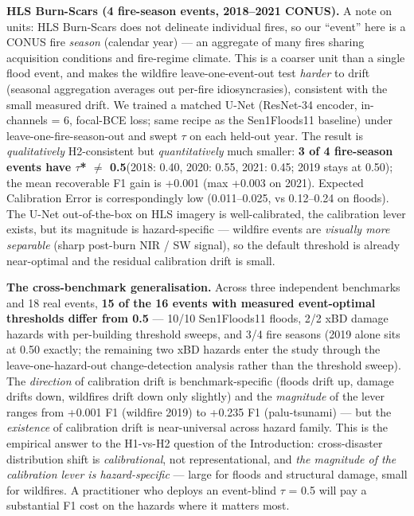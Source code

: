 \documentclass[sn-nature,lineno]{sn-jnl}
\theoremstyle{thmstyleone}
\theoremstyle{thmstyletwo}
\theoremstyle{thmstylethree}
\begin{document}
\textbf{HLS Burn-Scars (4 fire-season events, 2018--2021 CONUS).} A note on
units: HLS Burn-Scars does not delineate individual fires, so our
``event'' here is a CONUS fire \emph{season} (calendar year) --- an aggregate of
many fires sharing acquisition conditions and fire-regime climate. This
is a coarser unit than a single flood event, and makes the wildfire
leave-one-event-out test \emph{harder} to drift (seasonal aggregation
averages out per-fire idiosyncrasies), consistent with the small
measured drift. We trained a
matched U-Net (ResNet-34 encoder, in-channels = 6, focal-BCE loss; same
recipe as the Sen1Floods11 baseline) under leave-one-fire-season-out and
swept $\tau$ on each held-out year. The result is \emph{qualitatively} H2-consistent
but \emph{quantitatively} much smaller: \textbf{3 of 4 fire-season events have
$\tau$* $\neq$ 0.5}(2018: 0.40, 2020: 0.55, 2021: 0.45; 2019 stays at 0.50);
the mean recoverable F1 gain is +0.001 (max +0.003 on 2021). Expected
Calibration Error is correspondingly low (0.011--0.025, vs 0.12--0.24 on
floods). The U-Net out-of-the-box on HLS imagery is well-calibrated, the
calibration lever exists, but its magnitude is hazard-specific --- wildfire
events are \emph{visually more separable} (sharp post-burn NIR / SW signal),
so the default threshold is already near-optimal and the residual
calibration drift is small.

\textbf{The cross-benchmark generalisation.} Across three independent
benchmarks and 18 real events, \textbf{15 of the 16 events with measured
event-optimal thresholds differ from 0.5} --- 10/10 Sen1Floods11 floods,
2/2 xBD damage hazards with per-building threshold sweeps, and 3/4 fire
seasons (2019 alone sits at 0.50 exactly; the remaining two xBD hazards
enter the study through the leave-one-hazard-out change-detection
analysis rather than the threshold sweep).
The \emph{direction} of calibration drift is benchmark-specific (floods drift
up, damage drifts down, wildfires drift down only slightly) and the
\emph{magnitude} of the lever ranges from +0.001 F1 (wildfire 2019) to
+0.235 F1 (palu-tsunami) --- but the \emph{existence} of calibration drift is
near-universal across hazard family. This is the empirical answer to
the H1-vs-H2 question of the Introduction: cross-disaster distribution
shift is \emph{calibrational}, not representational, and \emph{the magnitude of
the calibration lever is hazard-specific} --- large for floods and
structural damage, small for wildfires. A practitioner who deploys an
event-blind $\tau$ = 0.5 will pay a substantial F1 cost on the hazards
where it matters most.
\end{document}
